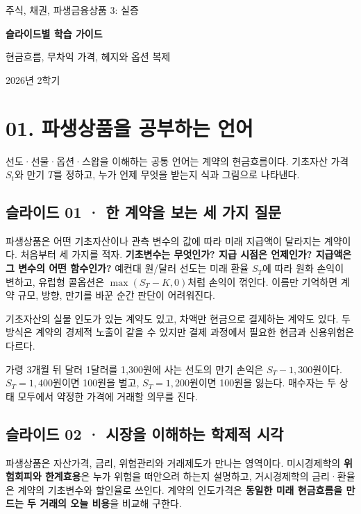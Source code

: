 \documentclass[11pt,a4paper]{article}
\begin{document}
\begin{titlepage}
\centering
\vspace*{3cm}
{\Large 주식, 채권, 파생금융상품 3: 실증\par}
\vspace{1.2cm}
{\Huge\bfseries 슬라이드별 학습 가이드\par}
\vspace{1.2cm}
{\large 현금흐름, 무차익 가격, 헤지와 옵션 복제\par}
\vfill
{\large 2026년 2학기\par}
\end{titlepage}
\tableofcontents
\clearpage

\section{01. 파생상품을 공부하는 언어}
선도·선물·옵션·스왑을 이해하는 공통 언어는 계약의 현금흐름이다. 기초자산 가격 $S_t$와 만기 $T$를 정하고, 누가 언제 무엇을 받는지 식과 그림으로 나타낸다.\par

\subsection{슬라이드 01 · 한 계약을 보는 세 가지 질문}
파생상품은 어떤 기초자산이나 관측 변수의 값에 따라 미래 지급액이 달라지는 계약이다. 처음부터 세 가지를 적자. \textbf{기초변수는 무엇인가? 지급 시점은 언제인가? 지급액은 그 변수의 어떤 함수인가?} 예컨대 원/달러 선도는 미래 환율 $S_T$에 따라 원화 손익이 변하고, 유럽형 콜옵션은 $\max(S_T-K,0)$처럼 손익이 꺾인다. 이름만 기억하면 계약 규모, 방향, 만기를 바꾼 순간 판단이 어려워진다.\par

기초자산의 실물 인도가 있는 계약도 있고, 차액만 현금으로 결제하는 계약도 있다. 두 방식은 계약의 경제적 노출이 같을 수 있지만 결제 과정에서 필요한 현금과 신용위험은 다르다.\par

가령 3개월 뒤 달러 1달러를 1,300원에 사는 선도의 만기 손익은 $S_T-1{,}300$원이다. $S_T=1{,}400$원이면 100원을 벌고, $S_T=1{,}200$원이면 100원을 잃는다. 매수자는 두 상태 모두에서 약정한 가격에 거래할 의무를 진다.\par

\subsection{슬라이드 02 · 시장을 이해하는 학제적 시각}
파생상품은 자산가격, 금리, 위험관리와 거래제도가 만나는 영역이다. 미시경제학의 \textbf{위험회피와 한계효용}은 누가 위험을 떠안으려 하는지 설명하고, 거시경제학의 금리·환율은 계약의 기초변수와 할인율로 쓰인다. 계약의 인도가격은 \textbf{동일한 미래 현금흐름을 만드는 두 거래의 오늘 비용}을 비교해 구한다.\par
\end{document}
